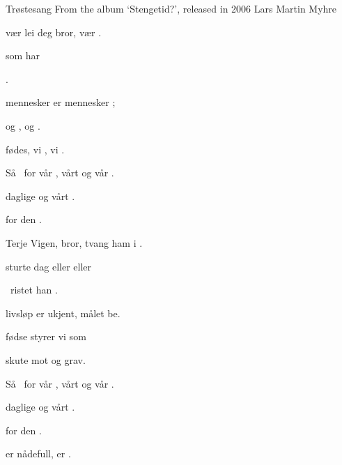 \begin{SBSong}{Tr\o stesang}
  {From the album `Stengetid?', released in 2006}
  {Lars Martin Myhre}
  \begin{SBVerse}
     v\ae r lei deg bror,  v\ae r .

      som  har 

      .

     mennesker er  mennesker ;

     og ,  og .

     f\o des, vi , vi .
  \end{SBVerse}
  \begin{SBChorus}
    S\aa\  for v\aa r , v\aa rt  og v\aa r .

     daglige  og v\aa rt  .

     for den  .
  \end{SBChorus}
  \begin{SBVerse}
     Terje Vigen, bror,  tvang ham i .

     sturte  dag eller  eller 

    \ ristet han  .

     livsl\o p er ukjent,  m\aa let be.

     f\o dse styrer vi  som 

     skute mot  og  grav.
  \end{SBVerse}
  \begin{SBChorus}
    S\aa\  for v\aa r , v\aa rt  og v\aa r .

     daglige  og v\aa rt  .

     for den  .
  \end{SBChorus}
  \CBPageBrk
  \begin{SBVerse}
     er n\aa defull,  er .


\end{SBVerse}
\end{SBSong}
